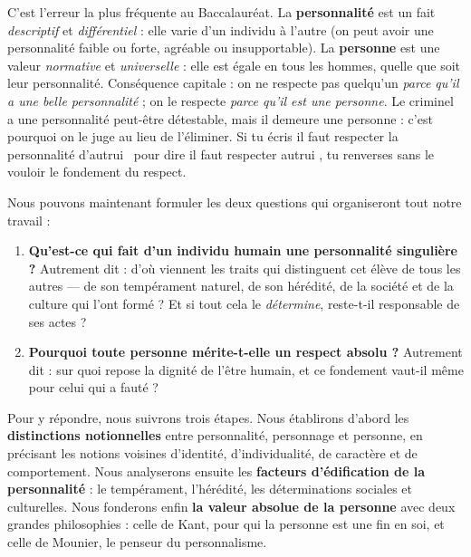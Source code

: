 \documentclass[11pt]{article}
\newcounter{popsec}
\newcounter{popsub}
\newcommand{\courssub}[1]{%
  \stepcounter{popsub}%
  \par\vspace{9pt}\noindent{\popxbold\fontsize{11.5}{13}\selectfont\color{popink}{\color{poporange}\thepopsec.\thepopsub}\hspace{6pt}#1}\par\nopagebreak\vspace{4pt}
}
\begin{document}
\begin{attention}
C'est l'erreur la plus fréquente au Baccalauréat. La \textbf{personnalité} est un fait \emph{descriptif} et \emph{différentiel} : elle varie d'un individu à l'autre (on peut avoir une personnalité faible ou forte, agréable ou insupportable). La \textbf{personne} est une valeur \emph{normative} et \emph{universelle} : elle est égale en tous les hommes, quelle que soit leur personnalité. Conséquence capitale : on ne respecte pas quelqu'un \emph{parce qu'il a une belle personnalité} ; on le respecte \emph{parce qu'il est une personne}. Le criminel a une personnalité peut-être détestable, mais il demeure une personne : c'est pourquoi on le juge au lieu de l'éliminer. Si tu écris \guillemotleft il faut respecter la personnalité d'autrui \guillemotright\ pour dire \guillemotleft il faut respecter autrui \guillemotright, tu renverses sans le vouloir le fondement du respect.
\end{attention}

\courssub{La problématique de la leçon}

Nous pouvons maintenant formuler les deux questions qui organiseront tout notre travail :

\begin{enumerate}
\item \textbf{Qu'est-ce qui fait d'un individu humain une personnalité singulière ?} Autrement dit : d'où viennent les traits qui distinguent cet élève de tous les autres — de son tempérament naturel, de son hérédité, de la société et de la culture qui l'ont formé ? Et si tout cela le \emph{détermine}, reste-t-il responsable de ses actes ?
\item \textbf{Pourquoi toute personne mérite-t-elle un respect absolu ?} Autrement dit : sur quoi repose la dignité de l'être humain, et ce fondement vaut-il même pour celui qui a fauté ?
\end{enumerate}

Pour y répondre, nous suivrons trois étapes. Nous établirons d'abord les \textbf{distinctions notionnelles} entre personnalité, personnage et personne, en précisant les notions voisines d'identité, d'individualité, de caractère et de comportement. Nous analyserons ensuite les \textbf{facteurs d'édification de la personnalité} : le tempérament, l'hérédité, les déterminations sociales et culturelles. Nous fonderons enfin \textbf{la valeur absolue de la personne} avec deux grandes philosophies : celle de Kant, pour qui la personne est une fin en soi, et celle de Mounier, le penseur du personnalisme.
\end{document}
